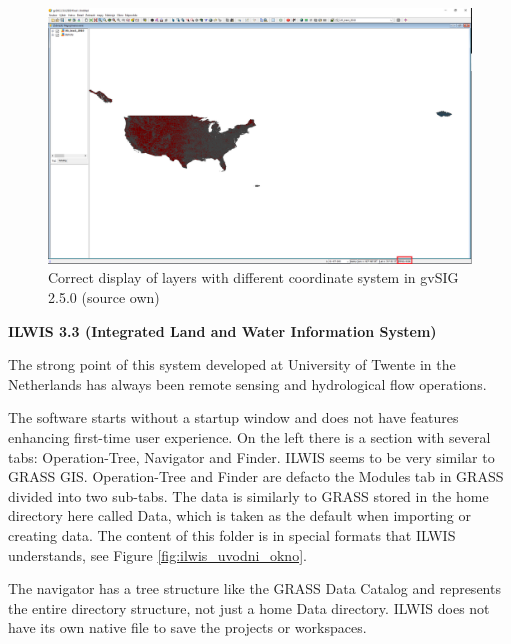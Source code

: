 \documentclass[a4paper,10pt,twoside]{article}
\begin{document}
\vspace{0.3cm}
\begin{figure}[hbt!] 
\begin{center}
\includegraphics[width=17cm]{../pictures/gvSIG_coords.PNG} 
\caption[Correct display of layers with different coordinate system in gvSIG 2.5.0 (source own)]{Correct display of layers with different coordinate system in gvSIG 2.5.0 (source own)}
\label{fig:gvSIG_coords}
\end{center}
\end{figure}

\newpage
\vspace*{-1cm} 
\bigskip
\noindent \textbf {ILWIS 3.3 (Integrated Land and Water Information System)}

\noindent The strong point of this system developed at University of Twente in the Netherlands has always been remote sensing and hydrological flow operations.

The software starts without a startup window and does not have features enhancing first-time user experience. On the left there is a section with several tabs: Operation-Tree, Navigator and Finder. ILWIS seems to be very similar to GRASS GIS. Operation-Tree and Finder are defacto the Modules tab in GRASS divided into two sub-tabs.  The data is similarly to GRASS stored in the home directory here called Data, which is taken as the default when importing or creating data. The content of this folder is in special formats that ILWIS understands, see Figure \ref{fig:ilwis_uvodni_okno}. 

The navigator has a tree structure like the GRASS Data Catalog and represents the entire directory structure, not just a home Data directory. ILWIS does not have its own native file to save the projects or workspaces.
\end{document}
